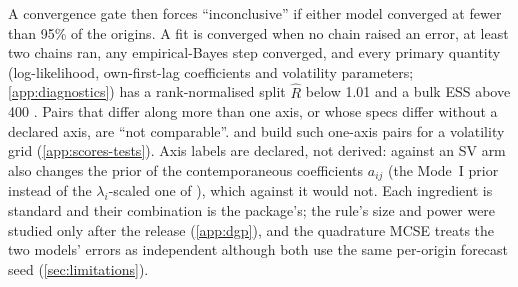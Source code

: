 A convergence gate then forces ``inconclusive'' if either model converged at fewer than 95\% of
the origins.
A fit is converged when no chain raised an error, at least two chains ran, any empirical-Bayes
step converged, and every primary quantity (log-likelihood, own-first-lag coefficients and
volatility parameters; \cref{app:diagnostics}) has a rank-normalised split $\hat R$ below 1.01 and
a bulk ESS above 400 \citep{vehtari2021rank}.
Pairs that differ along more than one axis, or whose specs differ without a declared axis, are
``not comparable''.
 and  build such one-axis pairs for a volatility grid
(\cref{app:scores-tests}).
Axis labels are declared, not derived: against  an SV arm also
changes the prior of the contemporaneous coefficients $a_{ij}$ (the Mode~I prior instead of the
$\lambda_i$-scaled one of \citealp{chan2022asymmetric}), which against  it
would not.
Each ingredient is standard and their combination is the package's; the rule's size and power
were studied only after the release (\cref{app:dgp}), and the quadrature MCSE treats the two models' errors as independent
although both use the same per-origin forecast seed (\cref{sec:limitations}).

